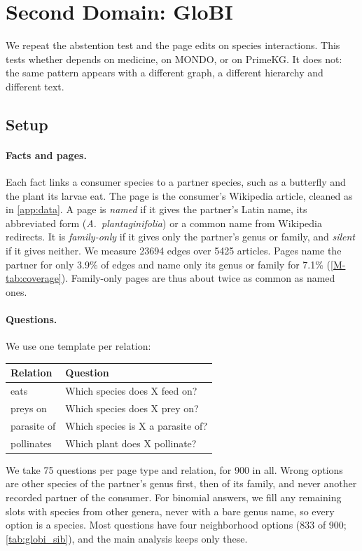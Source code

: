 \section{Second Domain: GloBI}
\label{app:globi}

We repeat the abstention test and the page edits on species interactions. This tests whether \clade{} depends on medicine, on MONDO, or on PrimeKG. It does not: the same pattern appears with a different graph, a different hierarchy and different text.

\subsection{Setup}

\paragraph{Facts and pages.}
Each fact links a consumer species to a partner species, such as a butterfly and the plant its larvae eat. The page is the consumer's Wikipedia article, cleaned as in \cref{app:data}. A page is \emph{named} if it gives the partner's Latin name, its abbreviated form (\emph{A.~plantaginifolia}) or a common name from Wikipedia redirects. It is \emph{family-only} if it gives only the partner's genus or family, and \emph{silent} if it gives neither. We measure \num{23694} edges over \num{5425} articles. Pages name the partner for only 3.9\% of edges and name only its genus or family for 7.1\% (\cref{M-tab:coverage}). Family-only pages are thus about twice as common as named ones.

\paragraph{Questions.}
We use one template per relation:
\begin{center}
\footnotesize
\begin{tabular}{@{}ll@{}}
\toprule
Relation & Question \\
\midrule
eats & Which species does X feed on? \\
preys on & Which species does X prey on? \\
parasite of & Which species is X a parasite of? \\
pollinates & Which plant does X pollinate? \\
\bottomrule
\end{tabular}
\end{center}
We take 75 questions per page type and relation, for 900 in all. Wrong options are other species of the partner's genus first, then of its family, and never another recorded partner of the consumer. For binomial answers, we fill any remaining slots with species from other genera, never with a bare genus name, so every option is a species. Most questions have four neighborhood options (833 of 900; \cref{tab:globi_sib}), and the main analysis keeps only these.

